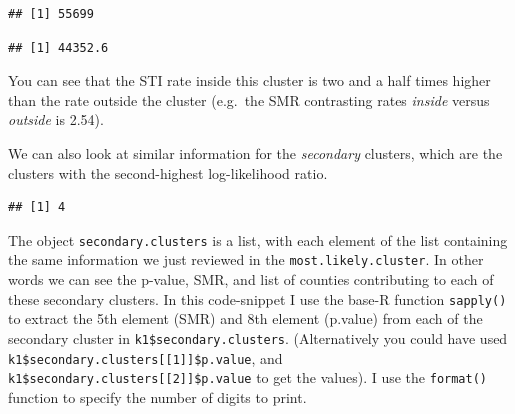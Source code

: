 \documentclass[
]{book}
\newenvironment{Shaded}{\begin{snugshade}}{\end{snugshade}}
\newcommand{\CommentTok}[1]{\textcolor[rgb]{0.56,0.35,0.01}{\textit{#1}}}
\newcommand{\FunctionTok}[1]{\textcolor[rgb]{0.00,0.00,0.00}{#1}}
\newcommand{\NormalTok}[1]{#1}
\newcommand{\SpecialCharTok}[1]{\textcolor[rgb]{0.00,0.00,0.00}{#1}}
\begin{document}
\begin{verbatim}
## [1] 55699
\end{verbatim}

\begin{Shaded}
\end{Shaded}

\begin{verbatim}
## [1] 44352.6
\end{verbatim}

You can see that the STI rate inside this cluster is two and a half times higher than the rate outside the cluster (e.g.~the SMR contrasting rates \emph{inside} versus \emph{outside} is 2.54).

We can also look at similar information for the \emph{secondary} clusters, which are the clusters with the second-highest log-likelihood ratio.

\begin{Shaded}
\end{Shaded}

\begin{verbatim}
## [1] 4
\end{verbatim}

The object \texttt{secondary.clusters} is a list, with each element of the list containing the same information we just reviewed in the \texttt{most.likely.cluster}. In other words we can see the p-value, SMR, and list of counties contributing to each of these secondary clusters. In this code-snippet I use the base-R function \texttt{sapply()} to extract the 5th element (SMR) and 8th element (p.value) from each of the secondary cluster in \texttt{k1\$secondary.clusters}. (Alternatively you could have used \texttt{k1\$secondary.clusters{[}{[}1{]}{]}\$p.value}, and \texttt{k1\$secondary.clusters{[}{[}2{]}{]}\$p.value} to get the values). I use the \texttt{format()} function to specify the number of digits to print.
\end{document}
